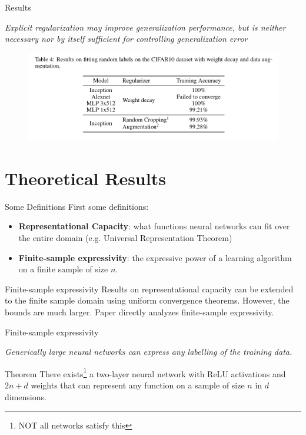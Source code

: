 \documentclass[10pt]{beamer}
\begin{document}
\begin{frame}{Results}
	\begin{center}
			\emph{Explicit regularization may improve generalization performance, but is neither necessary nor by itself sufficient for controlling generalization error}
	\end{center}

	\begin{figure}
		\centering
		\centering
		\includegraphics[width=\linewidth]{fig2c}
		\label{fig:withreg}
	\end{figure}
\end{frame}

\section{Theoretical Results}

\begin{frame}{Some Definitions}
	First some definitions:
	\begin{itemize}
		\item \textbf{Representational Capacity}: what functions neural networks can fit over the entire domain (e.g. Universal Representation Theorem)
		\item \textbf{Finite-sample expressivity}: the expressive power of a learning algorithm on a finite sample of size $n$.
	\end{itemize}
\end{frame}	

\begin{frame}{Finite-sample expressivity}
Results on representational capacity can be extended to the finite sample domain using uniform convergence theorems. However, the bounds are much larger. Paper directly analyzes finite-sample expressivity.
\end{frame}	

\begin{frame}{Finite-sample expressivity}
\begin{center}
	\emph{Generically large neural networks can express any labelling of the training data.}
\end{center}
\begin{block}{Theorem}
	There exists\footnote{NOT all networks satisfy this} a two-layer neural network with ReLU activations and $2n+d$
	weights that can represent any function on a sample of size $n$ in $d$ dimensions.
\end{block}
\end{frame}	
\end{document}
